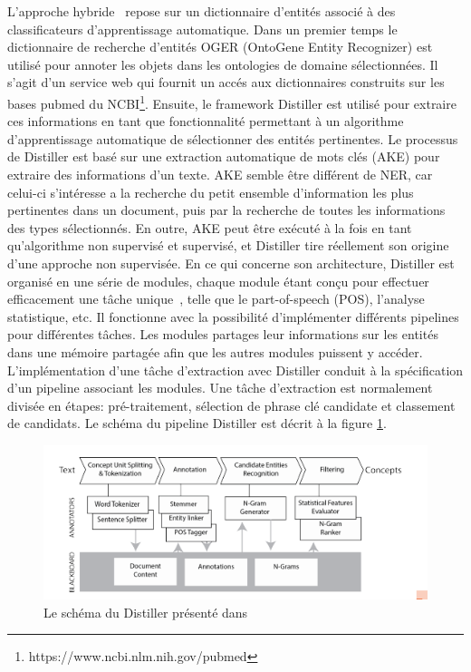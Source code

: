 L'approche hybride~\cite{Basaldella2017} repose sur un dictionnaire d'entités associé à des classificateurs d'apprentissage automatique. Dans un premier temps le dictionnaire de recherche d’entités OGER (OntoGene Entity Recognizer) est utilisé pour annoter les objets dans les ontologies de domaine sélectionnées. Il s'agit d'un service web qui fournit un accés aux dictionnaires construits sur les bases pubmed du NCBI\footnote{https://www.ncbi.nlm.nih.gov/pubmed}. Ensuite, le framework Distiller est utilisé pour extraire ces informations en tant que fonctionnalité permettant à un algorithme d’apprentissage automatique de sélectionner des entités pertinentes. Le processus de Distiller est basé sur une extraction automatique de mots clés (AKE) pour extraire des informations d’un texte. AKE semble être différent de NER, car celui-ci s'intéresse a la recherche du petit ensemble d'information les plus pertinentes dans un document, puis par la recherche de toutes les informations des types sélectionnés. En outre, AKE peut être exécuté à la fois en tant qu’algorithme non supervisé et supervisé, et Distiller tire réellement son origine d’une approche non supervisée. 
En ce qui concerne son architecture, Distiller est organisé en une série de modules, chaque module étant conçu pour effectuer efficacement une tâche unique~\cite{basaldella2015introducing}, telle que le part-of-speech (POS), l'analyse statistique, etc. Il fonctionne avec la possibilité d'implémenter différents pipelines pour différentes tâches. Les modules partages leur informations sur les entités dans une mémoire partagée afin que les autres modules puissent y accéder. L'implémentation d'une tâche d'extraction avec Distiller conduit à la spécification d'un pipeline associant les modules. Une tâche d'extraction est normalement divisée en étapes: pré-traitement, sélection de phrase clé candidate et classement de candidats. Le schéma du pipeline Distiller est décrit à la figure \ref{distiller}.

\begin{figure}[!ht]
\begin{center}
	\includegraphics[width=1\textwidth]{Figures/distiller.png}
\end{center}
\caption{\label{distiller} Le schéma du Distiller présenté dans ~\cite{Basaldella2017}}
\end{figure}

